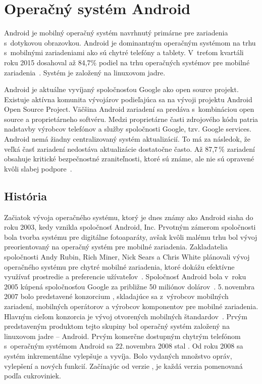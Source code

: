 \chapter{Operačný systém Android}
Android je mobilný operačný systém navrhnutý primárne pre zariadenia s~dotykovou obrazovkou. Android je dominantným operačným systémom na trhu s~mobilnými zariadeniami ako sú chytré telefóny a tablety. V~treťom kvartáli roku 2015 dosahoval až 84,7\% podiel na trhu operačných systémov pre mobilné zariadenia~\cite{Westenberg2015}. Systém je založený na linuxovom jadre.

Android je aktuálne vyvíjaný spoločnosťou Google ako open source projekt. Existuje aktívna komunita vývojárov podieľajúca sa na vývoji projektu Android Open Source Project. Väčšina Android zariadení sa predáva s~kombináciou open source a proprietárneho softvéru. Medzi proprietárne časti zdrojového kódu patria nadstavby výrobcov telefónov a služby spoločnosti Google, tzv. Google services. Android nemá žiadny centralizovaný systém aktualizácií. To má za následok, že veľká časť zariadení nedostáva aktualizácie dostatočne často. Až 87,7\,\% zariadení obsahuje kritické bezpečnostné zraniteľnosti, ktoré sú známe, ale nie sú opravené kvôli slabej podpore~\cite{Thomas2015}.


\section{História}
Začiatok vývoja operačného systému, ktorý je dnes známy ako Android siaha do roku 2003, kedy vznikla spoločnosť Android, Inc. Prvotným zámerom spoločnosti bola tvorba systému pre digitálne fotoaparáty, avšak kvôli malému trhu bol vývoj preorientovaný na operačný systém pre mobilné zariadenia. Zakladatelia spoločnosti Andy Rubin, Rich Miner, Nick Sears  a Chris White plánovali vývoj operačného systému pre chytré mobilné zariadenia, ktoré dokážu efektívne využívať prostredie a preferencie užívateľov~\cite{Beavis2008}. Spoločnosť Android bola v~roku 2005 kúpená spoločnosťou Google za približne 50 miliónov dolárov~\cite{Rosoff2011}. 5.\,novembra 2007 bolo predstavené konzorcium , skladajúce sa z~výrobcov mobilných zariadení, mobilných operátorov a výrobcov komponentov pre mobilné zariadenia. Hlavným cieľom konzorcia je vývoj otvorených mobilných štandardov~\cite{OHA}. Prvým predstaveným produktom tejto skupiny bol operačný systém založený na linuxovom jadre -- Android. Prvým komerčne dostupným chytrým telefónom s~operačným systémom Android sa 22.\,novembra 2008 stal . Od roku 2008 sa systém inkrementálne vylepšuje a vyvíja. Bolo vydaných množstvo opráv, vylepšení a nových funkcií. Začínajúc od verzie , je každá verzia pomenovaná podľa cukroviniek.

